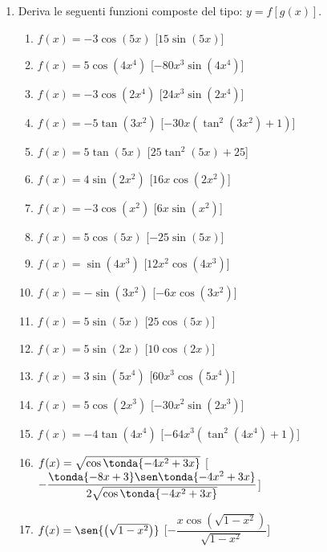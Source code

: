 \begin{enumerate}
\item Deriva le seguenti funzioni composte del tipo: \(y=f[g(x)]\).

\begin{enumerate}
\item \(f(x) = - 3 \cos{\left (5 x \right )}\) \hfill [\(15 \sin{\left (5 x 
\right )}\)]
\item \(f(x) = 5 \cos{\left (4 x^{4} \right )}\) \hfill [\(- 80 x^{3} \sin{\left 
(4 x^{4} \right )}\)]
\item \(f(x) = - 3 \cos{\left (2 x^{4} \right )}\) \hfill [\(24 x^{3} \sin{\left 
(2 x^{4} \right )}\)]
\item \(f(x) = - 5 \tan{\left (3 x^{2} \right )}\) \hfill [\(- 30 x 
\left(\tan^{2}{\left (3 x^{2} \right )} + 1\right)\)]
\item \(f(x) = 5 \tan{\left (5 x \right )}\) \hfill [\(25 \tan^{2}{\left (5 x 
\right )} + 25\)]
\item \(f(x) = 4 \sin{\left (2 x^{2} \right )}\) \hfill [\(16 x \cos{\left (2 
x^{2} \right )}\)]
\item \(f(x) = - 3 \cos{\left (x^{2} \right )}\) \hfill [\(6 x \sin{\left (x^{2} 
\right )}\)]
\item \(f(x) = 5 \cos{\left (5 x \right )}\) \hfill [\(- 25 \sin{\left (5 x 
\right )}\)]
\item \(f(x) = \sin{\left (4 x^{3} \right )}\) \hfill [\(12 x^{2} \cos{\left (4 
x^{3} \right )}\)]
\item \(f(x) = - \sin{\left (3 x^{2} \right )}\) \hfill [\(- 6 x \cos{\left (3 
x^{2} \right )}\)]
\item \(f(x) = 5 \sin{\left (5 x \right )}\) \hfill [\(25 \cos{\left (5 x \right 
)}\)]
\item \(f(x) = 5 \sin{\left (2 x \right )}\) \hfill [\(10 \cos{\left (2 x \right 
)}\)]
\item \(f(x) = 3 \sin{\left (5 x^{4} \right )}\) \hfill [\(60 x^{3} \cos{\left 
(5 x^{4} \right )}\)]
\item \(f(x) = 5 \cos{\left (2 x^{3} \right )}\) \hfill [\(- 30 x^{2} \sin{\left 
(2 x^{3} \right )}\)]
\item \(f(x) = - 4 \tan{\left (4 x^{4} \right )}\) \hfill [\(- 64 x^{3} 
\left(\tan^{2}{\left (4 x^{4} \right )} + 1\right)\)]
\item \(f(x) = \sqrt{\cos\tonda{-4x^2 +3x}}\) \hfill 
[\(-\dfrac{\tonda{-8x +3} \sen\tonda{-4x^2 +3x}}
          {2\sqrt{\cos\tonda{-4x^2 +3x}}}\)]
\item \(f(x) = \sen{\left (\sqrt{1-x^{2}} \right )}\) \hfill 
[\(-\dfrac{x \cos{\left (\sqrt{1-x^{2}} \right )}}{\sqrt{1-x^{2}}}\)]
 \end{enumerate}


\end{enumerate}
